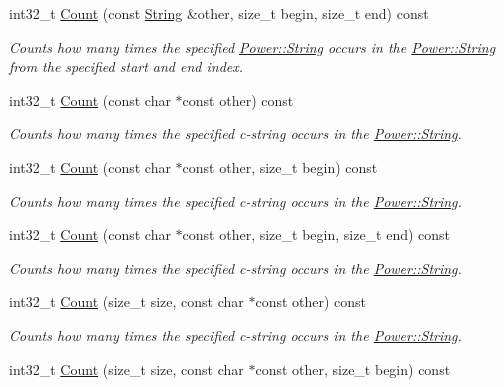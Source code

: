 \begin{DoxyCompactItemize}
int32\+\_\+t \hyperlink{class_power_1_1_string_a4f2a09de4b13eafd6f5c9ea2081d5e49}{Count} (const \hyperlink{class_power_1_1_string}{String} \&other, size\+\_\+t begin, size\+\_\+t end) const
\begin{DoxyCompactList}\small\item\em Counts how many times the specified \hyperlink{class_power_1_1_string}{Power\+::\+String} occurs in the \hyperlink{class_power_1_1_string}{Power\+::\+String} from the specified start and end index. \end{DoxyCompactList}\item 
int32\+\_\+t \hyperlink{class_power_1_1_string_a36e5b10f99975ae40bb612847a856f05}{Count} (const char $\ast$const other) const
\begin{DoxyCompactList}\small\item\em Counts how many times the specified c-\/string occurs in the \hyperlink{class_power_1_1_string}{Power\+::\+String}. \end{DoxyCompactList}\item 
int32\+\_\+t \hyperlink{class_power_1_1_string_ae852f7d9f1ef1893b921bf04a8dc8ad8}{Count} (const char $\ast$const other, size\+\_\+t begin) const
\begin{DoxyCompactList}\small\item\em Counts how many times the specified c-\/string occurs in the \hyperlink{class_power_1_1_string}{Power\+::\+String}. \end{DoxyCompactList}\item 
int32\+\_\+t \hyperlink{class_power_1_1_string_a8b72441aa89d3cb1c2a801ad6c468d86}{Count} (const char $\ast$const other, size\+\_\+t begin, size\+\_\+t end) const
\begin{DoxyCompactList}\small\item\em Counts how many times the specified c-\/string occurs in the \hyperlink{class_power_1_1_string}{Power\+::\+String}. \end{DoxyCompactList}\item 
int32\+\_\+t \hyperlink{class_power_1_1_string_ad1e26d91a1ea62ca5a710740a1afdaa2}{Count} (size\+\_\+t size, const char $\ast$const other) const
\begin{DoxyCompactList}\small\item\em Counts how many times the specified c-\/string occurs in the \hyperlink{class_power_1_1_string}{Power\+::\+String}. \end{DoxyCompactList}\item 
int32\+\_\+t \hyperlink{class_power_1_1_string_ad011b490c01e11258de540084f663cc8}{Count} (size\+\_\+t size, const char $\ast$const other, size\+\_\+t begin) const

\end{DoxyCompactItemize}
